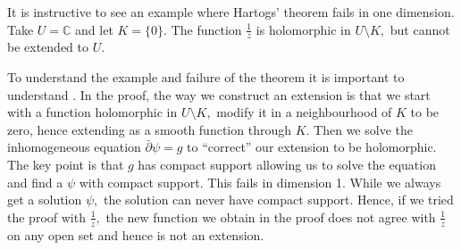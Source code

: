 \documentclass[12pt]{article}
\theoremstyle{theorem}
\theoremstyle{definition}
\theoremstyle{remark}
\begin{document}
It is instructive to see an example where Hartogs' theorem fails in one dimension.
Take $U = {\mathbb C}$ and let $K = \{0\}.$
The function $\frac{1}{z}$ is holomorphic in $U \setminus K,$ but cannot be extended to $U.$

To understand the example and failure of the theorem it is important to understand .  In the proof, the way we construct an extension is that we start with a function holomorphic in $U \setminus K,$
modify it in a neighbourhood of $K$ to be zero, hence extending as a smooth function through $K.$  Then we solve the
 inhomogeneous equation $\bar{\partial}\psi = g$ to ``correct'' our extension to be holomorphic.
The key point is that $g$ has compact support allowing us to solve the equation and find a $\psi$
with compact support.  This fails in dimension 1.  While we always get a solution $\psi,$ the solution can never have compact support.  Hence, if we tried the proof with $\frac{1}{z},$ the new function we obtain in the proof does not agree with $\frac{1}{z}$ on any open set and hence is not an extension.
\end{document}
